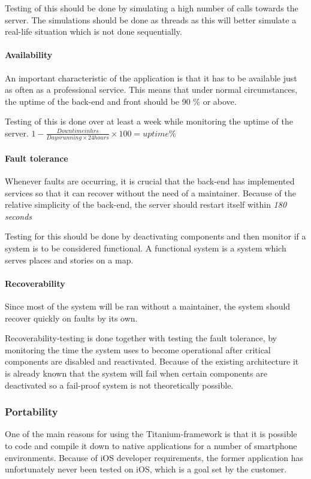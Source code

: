 Testing of this should be done by simulating a high number of calls towards the server. The simulations should be done as threads as this will better simulate a real-life situation which is not done sequentially.

\paragraph{Availability}
An important characteristic of the application is that it has to be available just as often as a professional service. This means that under normal circumstances, the uptime of the back-end and front should be 90 \% or above.

Testing of this is done over at least a week while monitoring the uptime of the server. $1-\frac{Downtime in hrs}{Days running \times 24 hours} \times 100 = uptime \% $

\paragraph{Fault tolerance}
Whenever faults are occurring, it is crucial that the back-end has implemented services so that it can recover without the need of a maintainer. Because of the relative simplicity of the back-end, the server should restart itself within \textit{180 seconds}

Testing for this should be done by deactivating components and then monitor if a system is to be considered functional. A functional system is a system which serves places and stories on a map.

\paragraph{Recoverability}
Since most of the system will be ran without a maintainer, the system should recover quickly on faults by its own.

Recoverability-testing is done together with testing the fault tolerance, by monitoring the time the system uses to become operational after critical components are disabled and reactivated. Because of the existing architecture it is already known that the system will fail when certain components are deactivated so a fail-proof system is not theoretically possible.

\subsubsection{Portability}
One of the main reasons for using the Titanium-framework is that it is possible to code and compile it down to native applications for a number of smartphone environments. Because of iOS developer requirements, the former application has unfortunately never been tested on iOS, which is a goal set by the customer.

